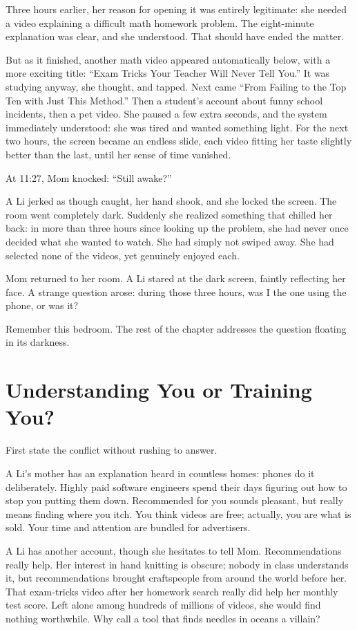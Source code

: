 Three hours earlier, her reason for opening it was entirely legitimate: she needed a video explaining a difficult math homework problem. The eight-minute explanation was clear, and she understood. That should have ended the matter.

But as it finished, another math video appeared automatically below, with a more exciting title: ``Exam Tricks Your Teacher Will Never Tell You.'' It was studying anyway, she thought, and tapped. Next came ``From Failing to the Top Ten with Just This Method.'' Then a student's account about funny school incidents, then a pet video. She paused a few extra seconds, and the system immediately understood: she was tired and wanted something light. For the next two hours, the screen became an endless slide, each video fitting her taste slightly better than the last, until her sense of time vanished.

At 11:27, Mom knocked: ``Still awake?''

A Li jerked as though caught, her hand shook, and she locked the screen. The room went completely dark. Suddenly she realized something that chilled her back: in more than three hours since looking up the problem, she had never once decided what she wanted to watch. She had simply not swiped away. She had selected none of the videos, yet genuinely enjoyed each.

Mom returned to her room. A Li stared at the dark screen, faintly reflecting her face. A strange question arose: during those three hours, was I the one using the phone, or was it?

Remember this bedroom. The rest of the chapter addresses the question floating in its darkness.

\section{Understanding You or Training You?}
First state the conflict without rushing to answer.

A Li's mother has an explanation heard in countless homes: phones do it deliberately. Highly paid software engineers spend their days figuring out how to stop you putting them down. Recommended for you sounds pleasant, but really means finding where you itch. You think videos are free; actually, you are what is sold. Your time and attention are bundled for advertisers.

A Li has another account, though she hesitates to tell Mom. Recommendations really help. Her interest in hand knitting is obscure; nobody in class understands it, but recommendations brought craftspeople from around the world before her. That exam-tricks video after her homework search really did help her monthly test score. Left alone among hundreds of millions of videos, she would find nothing worthwhile. Why call a tool that finds needles in oceans a villain?

